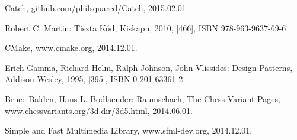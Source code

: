 \documentclass[12pt, twoside]{report}
\begin{document}
\begin{thebibliography}{Catch}
	 Catch, github.com/philsquared/Catch, 2015.02.01
			
	 Robert C. Martin: Tiszta Kód, Kiskapu, 2010, [466], ISBN 978-963-9637-69-6

	 CMake, www.cmake.org, 2014.12.01.
	
	 Erich Gamma, Richard Helm, Ralph Johnson, John Vlissides: Design Patterns, Addison-Wesley, 1995, [395], ISBN 0-201-63361-2
	
	 Bruce Balden, Hans L. Bodlaender: Raumschach, The Chess Variant Pages, www.chessvariants.org/3d.dir/3d5.html, 2014.06.01.
		
	 Simple and Fast Multimedia Library, www.sfml-dev.org, 2014.12.01.
\end{thebibliography}
\end{document}
